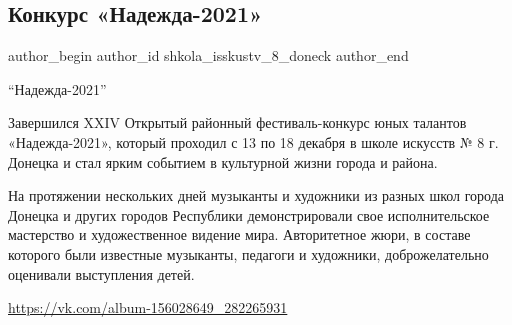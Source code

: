  
 
 
 
 
\subsection{Конкурс «Надежда-2021»}
\label{sec:20_12_2021.vk.shkola_isskustv_8_doneck.1.konkurs_nadezhda}

\ifcmt
 author_begin
   author_id shkola_isskustv_8_doneck
 author_end
\fi

\enquote{Надежда-2021}

Завершился XXIV Открытый районный фестиваль-конкурс юных талантов
«Надежда-2021», который проходил с 13 по 18 декабря в школе искусств № 8 г.
Донецка и стал ярким событием в культурной жизни города и района. 


На протяжении нескольких дней музыканты и художники из разных школ города
Донецка и других городов Республики демонстрировали свое исполнительское
мастерство и художественное видение мира. Авторитетное жюри, в составе которого
были известные музыканты, педагоги и художники, доброжелательно оценивали
выступления детей.

\url{https://vk.com/album-156028649_282265931}
